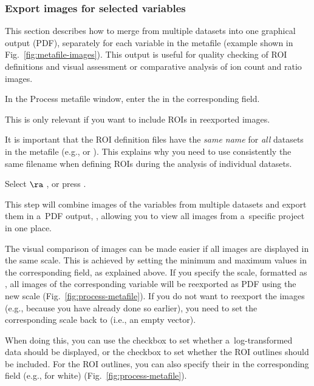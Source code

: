 \subsubsection{Export images for selected variables}
\label{sec:621}
\setcounter{step}{0}

This section describes how to merge  from multiple datasets into one graphical output (PDF), separately for each variable in the metafile (example shown in Fig.~\ref{fig:metafile-images}). This output is useful for quality checking of ROI definitions and visual assessment or comparative analysis of ion count and ratio images.

\s In the Process metafile window, enter the  in the corresponding field.

\bul This is only relevant if you want to include ROIs in reexported images.

\bul It is important that the ROI definition files have the \emph{same name} for \emph{all} datasets in the metafile (e.g.,  or ). This explains why you need to use consistently the same filename when defining ROIs during the analysis of individual datasets.

\s Select  $\ra$ , or press . 

\bul This step will combine images of the variables from multiple datasets and export them in a~PDF output, , allowing you to view all images from a~specific project in one place.

\bul The visual comparison of images can be made easier if all images are displayed in the same scale. This is achieved by setting the minimum and maximum values in the corresponding  field, as explained above. If you specify the scale, formatted as , all images of the corresponding variable will be reexported as PDF using the new scale (Fig.~\ref{fig:process-metafile}). If you do not want to reexport the images (e.g., because you have already done so earlier), you need to set the corresponding scale back to \ttt{[]} (i.e., an empty vector).

\bul When doing this, you can use the  checkbox to set whether a~log-transformed data should be displayed, or the  checkbox to set whether the ROI outlines should be included. For the ROI outlines, you can also specify their  in the corresponding field (e.g.,  for white) (Fig.~\ref{fig:process-metafile}). 

